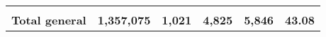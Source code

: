 \begin{tabular}{lrcclr}
	& \multicolumn{1}{l}{}                                           & \multicolumn{1}{l}{}                                       & \multicolumn{1}{l}{} &                                                                     & \multicolumn{1}{l}{}                                                         \\
	\rowcolor[HTML]{DDEBF7} 
	\textbf{Total   general}                                       & \textbf{1,357,075}                                             & \multicolumn{1}{r}{\cellcolor[HTML]{DDEBF7}\textbf{1,021}} & \textbf{4,825}       & \textbf{5,846}                                                      & \textbf{43.08}                                                              
\end{tabular}